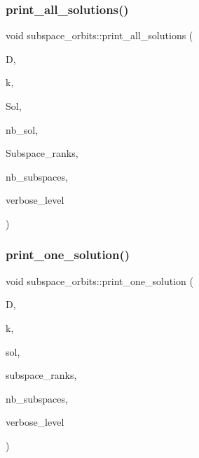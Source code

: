 \subsubsection{\texorpdfstring{print\+\_\+all\+\_\+solutions()}{print\_all\_solutions()}}
{\footnotesize\ttfamily void subspace\+\_\+orbits\+::print\+\_\+all\+\_\+solutions (\begin{DoxyParamCaption}\item[{\mbox{\hyperlink{classdiophant}{diophant}} $\ast$}]{D,  }\item[{\mbox{\hyperlink{galois_8h_a09fddde158a3a20bd2dcadb609de11dc}{I\+NT}}}]{k,  }\item[{\mbox{\hyperlink{galois_8h_a09fddde158a3a20bd2dcadb609de11dc}{I\+NT}} $\ast$}]{Sol,  }\item[{\mbox{\hyperlink{galois_8h_a09fddde158a3a20bd2dcadb609de11dc}{I\+NT}}}]{nb\+\_\+sol,  }\item[{\mbox{\hyperlink{galois_8h_a09fddde158a3a20bd2dcadb609de11dc}{I\+NT}} $\ast$$\ast$}]{Subspace\+\_\+ranks,  }\item[{\mbox{\hyperlink{galois_8h_a09fddde158a3a20bd2dcadb609de11dc}{I\+NT}} \&}]{nb\+\_\+subspaces,  }\item[{\mbox{\hyperlink{galois_8h_a09fddde158a3a20bd2dcadb609de11dc}{I\+NT}}}]{verbose\+\_\+level }\end{DoxyParamCaption})}

\mbox{\label{classsubspace__orbits_a9047cdfdfc64339f714ffe5e12a4b35f}} 
\subsubsection{\texorpdfstring{print\+\_\+one\+\_\+solution()}{print\_one\_solution()}}
{\footnotesize\ttfamily void subspace\+\_\+orbits\+::print\+\_\+one\+\_\+solution (\begin{DoxyParamCaption}\item[{\mbox{\hyperlink{classdiophant}{diophant}} $\ast$}]{D,  }\item[{\mbox{\hyperlink{galois_8h_a09fddde158a3a20bd2dcadb609de11dc}{I\+NT}}}]{k,  }\item[{\mbox{\hyperlink{galois_8h_a09fddde158a3a20bd2dcadb609de11dc}{I\+NT}} $\ast$}]{sol,  }\item[{\mbox{\hyperlink{galois_8h_a09fddde158a3a20bd2dcadb609de11dc}{I\+NT}} $\ast$\&}]{subspace\+\_\+ranks,  }\item[{\mbox{\hyperlink{galois_8h_a09fddde158a3a20bd2dcadb609de11dc}{I\+NT}} \&}]{nb\+\_\+subspaces,  }\item[{\mbox{\hyperlink{galois_8h_a09fddde158a3a20bd2dcadb609de11dc}{I\+NT}}}]{verbose\+\_\+level }\end{DoxyParamCaption})}

